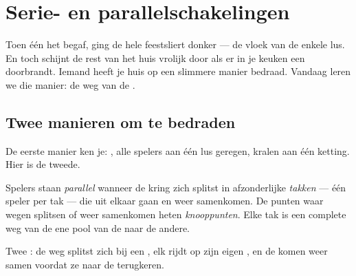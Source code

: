 \chapter{Serie- en parallelschakelingen}\label{ch:g5:series-parallel-circuits}

Toen één  het begaf, ging de hele feestsliert donker --- de vloek
van de enkele lus. En toch schijnt de rest van het huis vrolijk door
als er in je keuken een  doorbrandt. Iemand heeft je huis op een
slimmere manier bedraad. Vandaag leren we die manier: de weg van de
.

\section{Twee manieren om te bedraden}

De eerste manier ken je: \emph{}, alle spelers aan één lus
geregen, kralen aan één ketting. Hier is de tweede.

\begin{definition}[Parallel]\label{def:g5:series-parallel-circuits:parallel}
Spelers staan \emph{parallel} wanneer de
kring zich splitst in afzonderlijke \emph{takken} --- één
speler per tak --- die uit elkaar gaan en weer samenkomen. De punten
waar wegen splitsen of weer samenkomen heten
\emph{knooppunten}. Elke tak is een complete weg van
de ene pool van de  naar de andere.
\end{definition}

\begin{omfigure}

{\small Twee  : de weg splitst zich bij een
, elk  rijdt op zijn eigen , en de
 komen weer samen voordat ze naar de  terugkeren.}
\end{omfigure}

